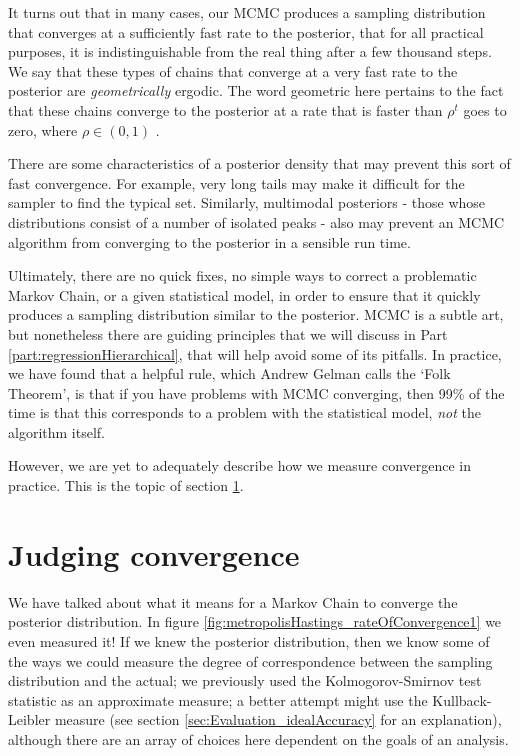 \documentclass[11pt,fullpage]{book}
\begin{document}
It turns out that in many cases, our MCMC produces a sampling distribution that converges at a sufficiently fast rate to the posterior, that for all practical purposes, it is indistinguishable from the real thing after a few thousand steps. We say that these types of chains that converge at a very fast rate to the posterior are \textit{geometrically} ergodic. The word geometric here pertains to the fact that these chains converge to the posterior at a rate that is faster than $\rho^t$ goes to zero, where $\rho\in(0,1)$ \cite{saidi2006stationarity}.

There are some characteristics of a posterior density that may prevent this sort of fast convergence. For example, very long tails may make it difficult for the sampler to find the typical set. Similarly, multimodal posteriors - those whose distributions consist of a number of isolated peaks - also may prevent an MCMC algorithm from converging to the posterior in a sensible run time.

Ultimately, there are no quick fixes, no simple ways to correct a problematic Markov Chain, or a given statistical model, in order to ensure that it quickly produces a sampling distribution similar to the posterior. MCMC is a subtle art, but nonetheless there are guiding principles that we will discuss in Part \ref{part:regressionHierarchical}, that will help avoid some of its pitfalls. In practice, we have found that a helpful rule, which Andrew Gelman calls the `Folk Theorem', is that if you have problems with MCMC converging, then 99\% of the time is that this corresponds to a problem with the statistical model, \textit{not} the algorithm itself.

However, we are yet to adequately describe how we measure convergence in practice. This is the topic of section \ref{sec:metropolisHastings_convergence}.

\section{Judging convergence}\label{sec:metropolisHastings_convergence}
We have talked about what it means for a Markov Chain to converge the posterior distribution. In figure \ref{fig:metropolisHastings_rateOfConvergence1} we even measured it! If we knew the posterior distribution, then we know some of the ways we could measure the degree of correspondence between the sampling distribution and the actual; we previously used the Kolmogorov-Smirnov test statistic as an approximate measure; a better attempt might use the Kullback-Leibler measure (see section \ref{sec:Evaluation_idealAccuracy} for an explanation), although there are an array of choices here dependent on the goals of an analysis. 
\end{document}
